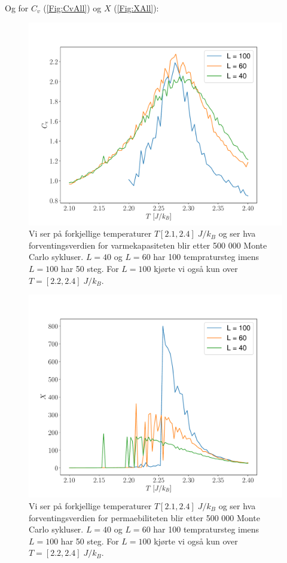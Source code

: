 \documentclass[reprint,english,notitlepage]{revtex4-2}  %
\begin{document}
Og for $C_v$ (\autoref{Fig:CvAll}) og $X$ (\autoref{Fig:XAll}):


\begin{figure}[H]
\centering
\includegraphics[scale=0.4, trim=2.5cm 0 0 0 ]{../Images/CvPerTAll.pdf}
\caption{Vi ser på forkjellige temperaturer $T [2.1, 2.4] \; J/k_B$ og ser hva forventingsverdien for varmekapasiteten blir etter 500 000 Monte Carlo sykluser. $L = 40$ og $L = 60$ har 100 tempratursteg imens $L = 100$ har 50 steg. For $L = 100$ kjørte vi også kun over $ T = [2.2, 2.4] \; J/k_B$.}
\label{Fig:CvAll}
\end{figure}

\begin{figure}[H]
\centering
\includegraphics[scale=0.4, trim=2.5cm 0 0 0 ]{../Images/XPerTAll.pdf}
\caption{Vi ser på forkjellige temperaturer $T [2.1, 2.4] \; J/k_B$ og ser hva forventingsverdien for permaebiliteten blir etter 500 000 Monte Carlo sykluser. $L = 40$ og $L = 60$ har 100 tempratursteg imens $L = 100$ har 50 steg. For $L = 100$ kjørte vi også kun over $ T = [2.2, 2.4] \; J/k_B$.}
\label{Fig:XAll}
\end{figure}
\end{document}
